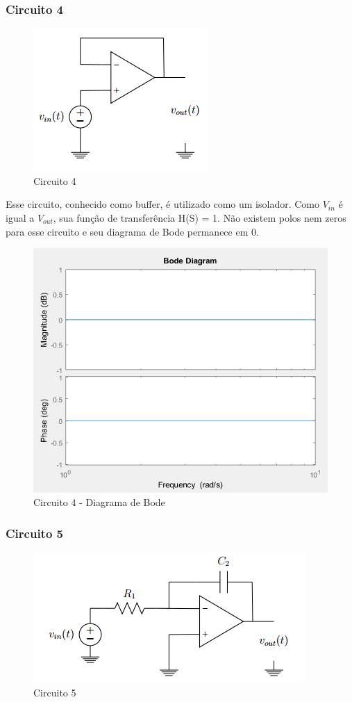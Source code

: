 \documentclass[a4paper, 12pt]{article}
\begin{document}
			\subsubsection{Circuito 4}
			\begin{figure}[!ht]
				\centering
				\includegraphics{img/circuito4.png}
				\caption{Circuito 4}	
			\end{figure}		
			
			Esse circuito, conhecido como buffer, é utilizado como um isolador. Como $V_{in}$ é igual a $V_{out}$, sua função de transferência  H(S) = 1. Não existem polos nem zeros para esse circuito e seu diagrama de Bode permanece em 0.
			\begin{figure}[!ht]
				\centering
				\includegraphics[scale=0.7]{img/1f_circ4.png}
				\caption{Circuito 4 - Diagrama de Bode}	
			\end{figure}				
			\subsubsection{Circuito 5}
			\begin{figure}[!ht]
				\centering
				\includegraphics{img/circuito5.png}
				\caption{Circuito 5}	
			\end{figure}							
\end{document}
